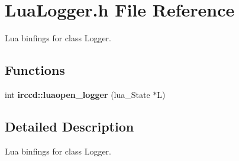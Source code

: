 \hypertarget{a00095}{\section{Lua\-Logger.\-h File Reference}
\label{a00095}
}


Lua binfings for class Logger.  


\subsection*{Functions}
\begin{DoxyCompactItemize}
\item 
int {\bfseries irccd\-::luaopen\-\_\-logger} (lua\-\_\-\-State $\ast$L)
\end{DoxyCompactItemize}


\subsection{Detailed Description}
Lua binfings for class Logger. 